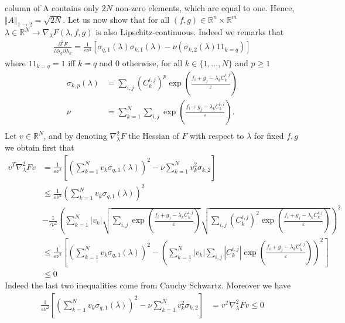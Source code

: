 \begin{prv*}
column of A contains only $2N$ non-zero elements, which
are equal to one. Hence, $\Vert A\Vert_{1\rightarrow 2} = \sqrt{2N}$. Let us now show that for all $(f,g)\in\mathbb{R}^n\times\mathbb{R}^m $ $\lambda\in\mathbb{R}^N \rightarrow \nabla_{\lambda} F(\lambda,f,g)$ is also Lipschitz-continuous. Indeed we remarks that 
\begin{align*}
    \frac{\partial^2 F}{\partial\lambda_q\partial\lambda_k} = \frac{1}{\varepsilon\nu^2}\left[\sigma_{q,1}(\lambda)\sigma_{k,1}(\lambda) - \nu (\sigma_{k,2}(\lambda)1\!\!1_{k=q})\right]
\end{align*}
where $1\!\!1_{k=q}=1$ iff $k=q$ and 0 otherwise, for all $k\in\{1,...,N\}$ and $p\geq 1$
\begin{align*}
    \sigma_{k,p}(\lambda) &= \sum_{i,j} (C_k^{i,j})^p \exp\left(\frac{f_i + g_j-\lambda_k C_k^{i,j}}{\varepsilon}\right) \\
    \nu &= \sum_{k=1}^N \sum_{i,j} \exp\left(\frac{f_i + g_j-\lambda_k C_k^{i,j}}{\varepsilon}\right).\\
\end{align*}
Let $v\in\mathbb{R}^N$, and by denoting $\nabla^2_{\lambda}F$ the Hessian of $F$ with respect to $\lambda$ for fixed $f,g$ we obtain first that 
\begin{align*}
  v^T \nabla^2_{\lambda}F v &=\frac{1}{\varepsilon\nu^2} \left[ \left(\sum_{k=1}^N v_k \sigma_{q,1}(\lambda)\right)^2 -\nu \sum_{k=1}^N v_k^2 \sigma_{k,2}\right]\\
  &\leq \frac{1}{\varepsilon\nu^2}\left(\sum_{k=1}^N v_k \sigma_{q,1}(\lambda)\right)^2 \\
  &-\frac{1}{\varepsilon\nu^2} \left(\sum_{k=1}^N |v_k| \sqrt{\sum_{i,j} \exp\left(\frac{f_i + g_j-\lambda_k C_k^{i,j}}{\varepsilon}\right)}  \sqrt{\sum_{i,j} (C_k^{i,j})^2 \exp\left(\frac{f_i + g_j-\lambda_k C_k^{i,j}}{\varepsilon}\right)} \right)^2 \\
  &\leq \frac{1}{\varepsilon\nu^2}\left[\left(\sum_{k=1}^N v_k \sigma_{q,1}(\lambda)\right)^2- \left(\sum_{k=1}^N |v_k| \sum_{i,j}  |C_k^{i,j}| \exp\left(\frac{f_i + g_j-\lambda_k C_k^{i,j}}{\varepsilon}\right)\right)^2\right]\\
  &\leq 0
 \end{align*}
Indeed the last two inequalities come from Cauchy Schwartz. Moreover we have
\begin{align*}
 \frac{1}{\varepsilon\nu^2} \left[ \left(\sum_{k=1}^N v_k \sigma_{q,1}(\lambda)\right)^2 -\nu \sum_{k=1}^N v_k^2 \sigma_{k,2}\right] & = v^T \nabla^2_{\lambda}F v \leq 0   \\

\end{align*}
\end{prv*}
